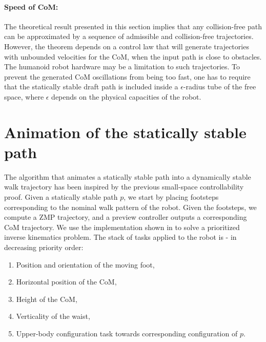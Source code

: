\documentclass{article}
\begin{document}
\paragraph{Speed of CoM:} The theoretical result presented in this section implies
that any collision-free path can be approximated by a sequence of admissible 
and collision-free trajectories. However, the theorem depends on a control law
that will generate trajectories with unbounded velocities for the CoM, when the input
path is close to obstacles. The humanoid robot
hardware may be a limitation to such trajectories. To prevent the generated CoM 
oscillations from being too fast, one has to require that the statically stable 
draft path is included
inside a $\epsilon$-radius tube of the free space, where $\epsilon$ depends on the
physical capacities of the robot.

\section{Animation of the statically stable path}

\label{sec:animation}

The  algorithm   that  animates  a  statically  stable   path  into  a
dynamically stable  walk trajectory has been inspired  by the previous
small-space controllability  proof. Given a statically  stable path $p$,
we  start  by placing  footsteps  corresponding  to  the nominal  walk
pattern  of the  robot. Given the footsteps, we  compute a ZMP trajectory, 
and a preview controller outputs  a corresponding CoM trajectory. We
use  the implementation  shown in  \cite{yoshida2006tds} to  solve a
prioritized inverse kinematics problem.  The stack of tasks applied to
the robot is - in decreasing priority order:
\begin{enumerate}

\item Position and orientation of the moving foot,

\item Horizontal position of the CoM,

\item Height of the CoM,

\item Verticality of the waist,

\item Upper-body configuration task towards corresponding
  configuration  of $p$.

\end{enumerate}
\end{document}
